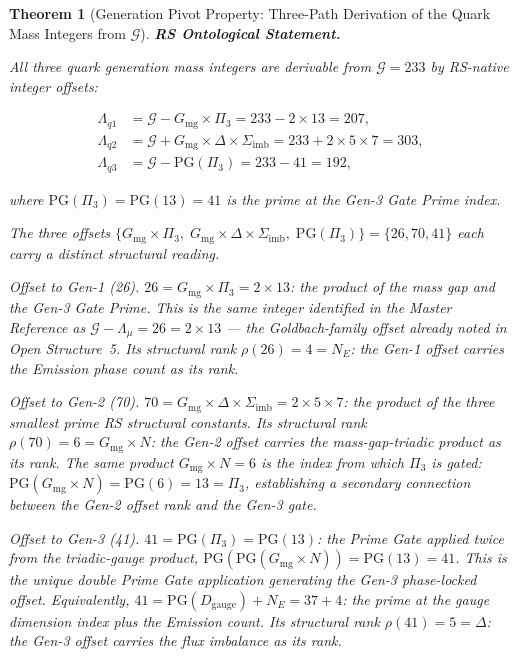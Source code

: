 \documentclass[11pt, letterpaper]{article}
\theoremstyle{definition}
\theoremstyle{plain}
\newtheorem{theorem}{Theorem}[section]
\begin{document}
\begin{theorem}[Generation Pivot Property: Three-Path Derivation of the Quark Mass Integers from $\mathcal{G}$]

\textbf{RS Ontological Statement.}

All three quark generation mass integers are derivable from $\mathcal{G} = 233$ by
RS-native integer offsets:

\begin{align}
    \Lambda_{q1} &= \mathcal{G} - G_\mathrm{mg} \times \Pi_3
                  = 233 - 2 \times 13 = 207, \label{eq:piv_q1}\\
    \Lambda_{q2} &= \mathcal{G} + G_\mathrm{mg} \times \Delta \times \Sigma_\mathrm{imb}
                  = 233 + 2 \times 5 \times 7 = 303, \label{eq:piv_q2}\\
    \Lambda_{q3} &= \mathcal{G} - \mathrm{PG}(\Pi_3)
                  = 233 - 41 = 192, \label{eq:piv_q3}
\end{align}

where $\mathrm{PG}(\Pi_3) = \mathrm{PG}(13) = 41$ is the prime at the Gen-3 Gate
Prime index.

\medskip
The three offsets $\{G_\mathrm{mg} \times \Pi_3,\; G_\mathrm{mg} \times \Delta
\times \Sigma_\mathrm{imb},\; \mathrm{PG}(\Pi_3)\}
= \{26, 70, 41\}$ each carry a distinct structural reading.

\medskip
\noindent\textit{Offset to Gen-1 (26).}
$26 = G_\mathrm{mg} \times \Pi_3 = 2 \times 13$: the product of the mass gap and the
Gen-3 Gate Prime. This is the same integer identified in the Master Reference as
$\mathcal{G} - \Lambda_\mu = 26 = 2 \times 13$ — the Goldbach-family offset already
noted in Open Structure~5. Its structural rank $\rho(26) = 4 = N_E$: the Gen-1 offset
carries the Emission phase count as its rank.

\medskip
\noindent\textit{Offset to Gen-2 (70).}
$70 = G_\mathrm{mg} \times \Delta \times \Sigma_\mathrm{imb} = 2 \times 5 \times 7$:
the product of the three smallest prime RS structural constants. Its structural rank
$\rho(70) = 6 = G_\mathrm{mg} \times N$: the Gen-2 offset carries the mass-gap-triadic
product as its rank. The same product $G_\mathrm{mg} \times N = 6$ is the index from
which $\Pi_3$ is gated: $\mathrm{PG}(G_\mathrm{mg} \times N) = \mathrm{PG}(6) = 13
= \Pi_3$, establishing a secondary connection between the Gen-2 offset rank and the
Gen-3 gate.

\medskip
\noindent\textit{Offset to Gen-3 (41).}
$41 = \mathrm{PG}(\Pi_3) = \mathrm{PG}(13)$: the Prime Gate applied twice from the
triadic-gauge product, $\mathrm{PG}(\mathrm{PG}(G_\mathrm{mg} \times N)) = \mathrm{PG}(13) = 41$.
This is the unique double Prime Gate application generating the Gen-3 phase-locked
offset. Equivalently, $41 = \mathrm{PG}(D_\mathrm{gauge}) + N_E = 37 + 4$: the prime
at the gauge dimension index plus the Emission count. Its structural rank $\rho(41) =
5 = \Delta$: the Gen-3 offset carries the flux imbalance as its rank.


\end{theorem}
\end{document}
